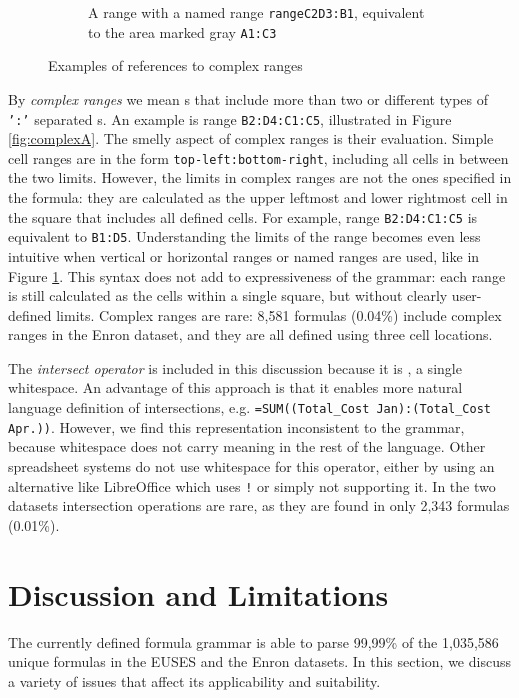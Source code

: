 \documentclass[conference]{IEEEtran}
\begin{document}
\begin{figure}
\begin{subfigure}[b]{0.4\textwidth}
		\vspace{0.1mm}
		\caption{A range with a named range \texttt{rangeC2D3:B1}, equivalent to the area marked gray \texttt{A1:C3}}
		\label{fig:complexB}
	\end{subfigure}
		\caption{Examples of references to complex ranges}\label{Figure:ComplexRanges}
\end{figure}

By \textit{complex ranges} we mean s that include more than two or different types of \texttt{':'} separated s. An example is range \texttt{B2:D4:C1:C5}, illustrated in Figure \ref{fig:complexA}. The smelly aspect of complex ranges is their evaluation. Simple cell ranges are in the form \texttt{top-left:bottom-right}, including all cells in between the two limits. However, the limits in complex ranges are not the ones specified in the formula: they are calculated as the upper leftmost and lower rightmost cell in the square that includes all defined cells. For example, range \texttt{B2:D4:C1:C5} is equivalent to \texttt{B1:D5}. Understanding the limits of the range becomes even less intuitive when vertical or horizontal ranges or named ranges are used, like in Figure \ref{fig:complexB}. This syntax does not add to expressiveness of the grammar: each range is still calculated as the cells within a single square, but without clearly user-defined limits. Complex ranges are rare: 8,581 formulas	(0.04\%) include complex ranges in the Enron dataset, and they are all defined using three cell locations. 

The \textit{intersect operator} is included in this discussion because it is \texttt{}, a single whitespace.
An advantage of this approach is that it enables more natural language definition of intersections, e.g. \texttt{=SUM((Total_Cost Jan):(Total_Cost Apr.))}.
However, we find this representation inconsistent to the grammar, because whitespace does not carry meaning in the rest of the language. Other spreadsheet systems do not use whitespace for this operator, either by using an alternative like LibreOffice which uses \texttt{!} or simply not supporting it. In the two datasets intersection operations are rare, as they are found in only 2,343 formulas (0.01\%).

\section{Discussion and Limitations}
\label{sec:discussion}
The currently defined formula grammar is able to parse 99,99\% of the 1,035,586 unique formulas in the EUSES and the Enron datasets. In this section, we discuss a variety of issues that affect its applicability and suitability.
\end{document}
